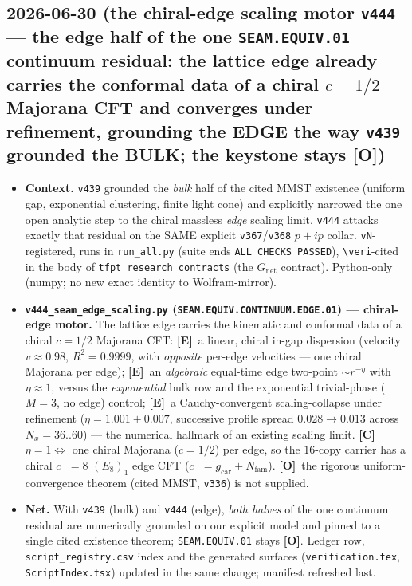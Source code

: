 \documentclass[11pt]{article}
\providecommand{\mE}{\textbf{[E]}}\providecommand{\mC}{\textbf{[C]}}
\providecommand{\mO}{\textbf{[O]}}\providecommand{\mX}{\textbf{[X]}}
\providecommand{\gcar}{g_{\mathrm{car}}}\providecommand{\Nfam}{N_{\mathrm{fam}}}
\begin{document}
\subsection*{2026-06-30 (the chiral-edge scaling motor \texttt{v444} --- the edge half of the one \texttt{SEAM.EQUIV.01} continuum residual: the lattice edge already carries the conformal data of a chiral $c{=}1/2$ Majorana CFT and converges under refinement, grounding the EDGE the way \texttt{v439} grounded the BULK; the keystone stays \mO)}
\begin{itemize}
\item \textbf{Context.} \texttt{v439} grounded the \emph{bulk} half of the cited MMST existence (uniform gap,
exponential clustering, finite light cone) and explicitly narrowed the one open analytic step to the chiral massless
\emph{edge} scaling limit. \texttt{v444} attacks exactly that residual on the SAME explicit \texttt{v367}/\texttt{v368}
$p{+}ip$ collar. \texttt{vN}-registered, runs in \texttt{run\_all.py} (suite ends \texttt{ALL CHECKS PASSED}),
\texttt{\textbackslash veri}-cited in the body of \texttt{tfpt\_research\_contracts} (the $G_{\mathrm{net}}$ contract).
Python-only (numpy; no new exact identity to Wolfram-mirror).
\item \textbf{\texttt{v444\_seam\_edge\_scaling.py} (\texttt{SEAM.EQUIV.CONTINUUM.EDGE.01}) --- chiral-edge motor.}
The lattice edge carries the kinematic and conformal data of a chiral $c{=}1/2$ Majorana CFT: \mE\ a linear, chiral
in-gap dispersion (velocity $v{\approx}0.98$, $R^2{=}0.9999$, with \emph{opposite} per-edge velocities --- one chiral
Majorana per edge); \mE\ an \emph{algebraic} equal-time edge two-point $\sim r^{-\eta}$ with $\eta{\approx}1$, versus
the \emph{exponential} bulk row and the exponential trivial-phase ($M{=}3$, no edge) control; \mE\ a Cauchy-convergent
scaling-collapse under refinement ($\eta{=}1.001{\pm}0.007$, successive profile spread $0.028{\to}0.013$ across
$N_x{=}36..60$) --- the numerical hallmark of an existing scaling limit. \mC\ $\eta{=}1\Leftrightarrow$ one chiral
Majorana ($c{=}1/2$) per edge, so the $16$-copy carrier has a chiral $c_-{=}8$ $(E_8)_1$ edge CFT
($c_-{=}\gcar{+}\Nfam$). \mO\ the rigorous uniform-convergence theorem (cited MMST, \texttt{v336}) is not supplied.
\item \textbf{Net.} With \texttt{v439} (bulk) and \texttt{v444} (edge), \emph{both halves} of the one continuum
residual are numerically grounded on our explicit model and pinned to a single cited existence theorem;
\texttt{SEAM.EQUIV.01} stays \mO. Ledger row, \texttt{script\_registry.csv} index and the generated surfaces
(\texttt{verification.tex}, \texttt{ScriptIndex.tsx}) updated in the same change; manifest refreshed last.
\end{itemize}
\end{document}
